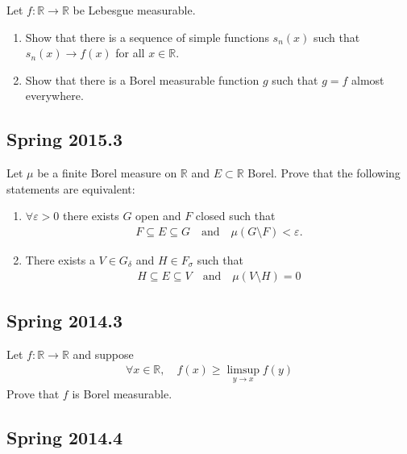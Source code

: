 Let \(f: {\mathbb{R}}\to {\mathbb{R}}\) be Lebesgue measurable.

\begin{enumerate}
\def\labelenumi{\arabic{enumi}.}
\tightlist
\item
  Show that there is a sequence of simple functions \(s_n(x)\) such that
  \(s_n(x) \to f(x)\) for all \(x\in {\mathbb{R}}\).
\item
  Show that there is a Borel measurable function \(g\) such that
  \(g = f\) almost everywhere.
\end{enumerate}

\hypertarget{spring-2015.3}{%
\subsection{Spring 2015.3}\label{spring-2015.3}}

Let \(\mu\) be a finite Borel measure on \({\mathbb{R}}\) and
\(E \subset {\mathbb{R}}\) Borel. Prove that the following statements
are equivalent:

\begin{enumerate}
\def\labelenumi{\arabic{enumi}.}
\tightlist
\item
  \(\forall \varepsilon > 0\) there exists \(G\) open and \(F\) closed
  such that
  \begin{align*}
  F \subseteq E \subseteq G \quad \text{and} \quad \mu(G\setminus F) < \varepsilon.
  \end{align*}
\item
  There exists a \(V \in G_\delta\) and \(H \in F_\sigma\) such that
  \begin{align*}
  H \subseteq E \subseteq V \quad \text{and}\quad \mu(V\setminus H) = 0
  \end{align*}
\end{enumerate}

\hypertarget{spring-2014.3}{%
\subsection{Spring 2014.3}\label{spring-2014.3}}

Let \(f: {\mathbb{R}}\to {\mathbb{R}}\) and suppose
\begin{align*}
\forall x\in {\mathbb{R}},\quad f(x) \geq \limsup _{y \rightarrow x} f(y)
\end{align*}
Prove that \(f\) is Borel measurable.

\hypertarget{spring-2014.4}{%
\subsection{Spring 2014.4}\label{spring-2014.4}}

